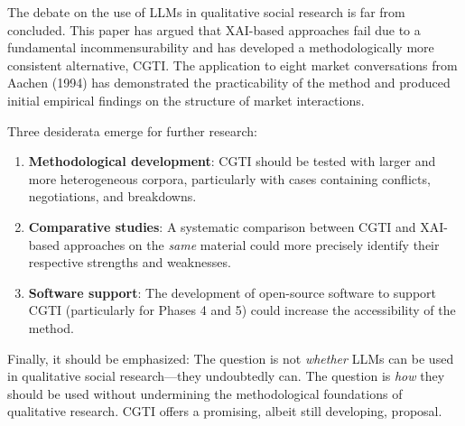 \documentclass[12pt,a4paper]{article}
\begin{document}
The debate on the use of LLMs in qualitative social research is far from concluded. This paper has argued that XAI-based approaches fail due to a fundamental incommensurability and has developed a methodologically more consistent alternative, CGTI. The application to eight market conversations from Aachen (1994) has demonstrated the practicability of the method and produced initial empirical findings on the structure of market interactions.

Three desiderata emerge for further research:

\begin{enumerate}
    \item \textbf{Methodological development}: CGTI should be tested with larger and more heterogeneous corpora, particularly with cases containing conflicts, negotiations, and breakdowns.
    
    \item \textbf{Comparative studies}: A systematic comparison between CGTI and XAI-based approaches on the \textit{same} material could more precisely identify their respective strengths and weaknesses.
    
    \item \textbf{Software support}: The development of open-source software to support CGTI (particularly for Phases 4 and 5) could increase the accessibility of the method.
\end{enumerate}

Finally, it should be emphasized: The question is not \textit{whether} LLMs can be used in qualitative social research—they undoubtedly can. The question is \textit{how} they should be used without undermining the methodological foundations of qualitative research. CGTI offers a promising, albeit still developing, proposal.
\end{document}
